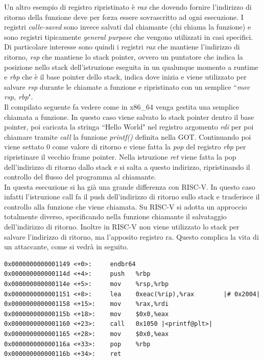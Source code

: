Un altro esempio di registro ripristinato è \textit{rax} che dovendo fornire l'indirizzo di ritorno della funzione deve per forza essere sovrascritto ad ogni esecuzione.
I registri \textit{calle-saved} sono invece salvati dal chiamante (chi chiama la funzione) e sono registri tipicamente \textit{general purpose} che vengono utilizzati in casi specifici.\\
\newline
Di particolare interesse sono quindi i registri \textit{rax} che mantiene l'indirizzo di ritorno, \textit{rsp} che mantiene lo stack pointer, ovvero un puntatore che indica la posizione nello stack dell'istruzione eseguita in un qualunque momento a runtime e \textit{rbp} che è il base pointer dello stack, indica dove inizia e viene utilizzato per salvare \textit{rsp} durante le chiamate a funzione e ripristinato con un semplice ``\textit{mov rsp, rbp}".\\
\newline
Il compilato seguente fa vedere come in x86\_64 venga gestita una semplice chiamata a funzione. In questo caso viene salvato lo stack pointer dentro il base pointer, poi caricata la stringa ``Hello World" nel registro argomento \textit{rdi} per poi chiamare tramite \textit{call} la funzione \textit{printf()} definita nella GOT. Continuando poi viene settato 0 come valore di ritorno e viene fatta la \textit{pop} del registro \textit{rbp} per ripristinare il vecchio frame pointer. Nella istruzione \textit{ret} viene fatta la pop dell'indirizzo di ritorno dallo stack e si salta a questo indirizzo, ripristinando il controllo del flusso del programma al chiamante.\\
In questa esecuzione si ha già una grande differenza con RISC-V. In questo caso infatti l'istruzione call fa il push dell'indirizzo di ritorno sullo stack e trasferisce il controllo alla funzione che viene chiamata. Su RISC-V si adotta un approccio totalmente diverso, specificando nella funzione chiamante il salvataggio dell'indirizzo di ritorno. Inoltre in RISC-V non viene utilizzato lo stack per salvare l'indirizzo di ritorno, ma l'apposito registro ra. Questo complica la vita di un attaccante, come si vedrà in seguito.
\begin{verbatim}
0x0000000000001149 <+0>:     endbr64
0x000000000000114d <+4>:     push   %rbp
0x000000000000114e <+5>:     mov    %rsp,%rbp
0x0000000000001151 <+8>:     lea    0xeac(%rip),%rax        |# 0x2004|
0x0000000000001158 <+15>:    mov    %rax,%rdi
0x000000000000115b <+18>:    mov    $0x0,%eax
0x0000000000001160 <+23>:    call   0x1050 |<printf@plt>|
0x0000000000001165 <+28>:    mov    $0x0,%eax
0x000000000000116a <+33>:    pop    %rbp
0x000000000000116b <+34>:    ret   
\end{verbatim}
